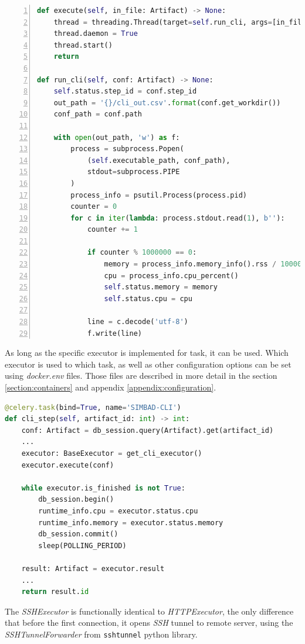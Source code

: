 \begin{lstlisting}[label=list:sp-exec-local,caption=Fragment of \textit{LocalExecutor} for \textit{SimBaD-CLI}, basicstyle=\footnotesize\ttfamily, language=python, numbers=left]
def execute(self, in_file: Artifact) -> None:
    thread = threading.Thread(target=self.run_cli, args=[in_file])
    thread.daemon = True
    thread.start()
    return
    
def run_cli(self, conf: Artifact) -> None:
    self.status.step_id = conf.step_id
    out_path = '{}/cli_out.csv'.format(conf.get_workdir())
    conf_path = conf.path

    with open(out_path, 'w') as f:
        process = subprocess.Popen(
            (self.executable_path, conf_path), 
            stdout=subprocess.PIPE
        )
        process_info = psutil.Process(process.pid)
        counter = 0
        for c in iter(lambda: process.stdout.read(1), b''):
            counter += 1

            if counter % 1000000 == 0:
                memory = process_info.memory_info().rss / 1000000
                cpu = process_info.cpu_percent()
                self.status.memory = memory
                self.status.cpu = cpu

            line = c.decode('utf-8')
            f.write(line)
\end{lstlisting}
As long as the specific executor is implemented for task, it can be used. Which executor is used to which task, as well as other configuration options can be set using \textit{docker.env} files. Those files are described in more detail in the section \ref{section:containers} and appendix \ref{appendix:configuration}.
\begin{lstlisting}[label=list:sp-exec-local-use,caption=Use of LocalExecutor for SimBaD-CLI step, basicstyle=\footnotesize\ttfamily, language=python]
@celery.task(bind=True, name='SIMBAD-CLI')
def cli_step(self, artifact_id: int) -> int:
    conf: Artifact = db_session.query(Artifact).get(artifact_id)
    ...
    executor: BaseExecutor = get_cli_executor()
    executor.execute(conf)

    while executor.is_finished is not True:
        db_session.begin()
        runtime_info.cpu = executor.status.cpu
        runtime_info.memory = executor.status.memory
        db_session.commit()
        sleep(POLLING_PERIOD)

    result: Artifact = executor.result
    ...
    return result.id
\end{lstlisting}
The \textit{SSHExecutor} is functionally identical to \textit{HTTPExecutor}, the only difference that before the first connection, it opens \textit{SSH} tunnel to remote server, using the \textit{SSHTunnelForwarder} from \texttt{sshtunnel} python library.
